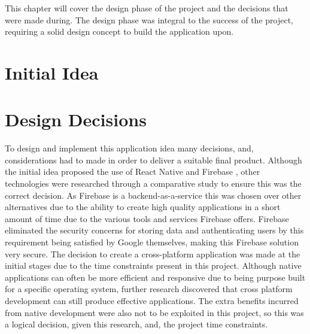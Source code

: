 This chapter will cover the design phase of the project and the decisions  that were made during. The design phase was integral to the success of the project, requiring a solid design concept to build the application upon.

\section{Initial Idea}


\section{Design Decisions}\label{designDecis}
To design and implement this application idea many decisions, and, considerations had to made in order to deliver a suitable final product. Although the initial idea proposed the use of React Native \cite{reactnative} and Firebase \cite{firebase}, other technologies were researched through a comparative study \cite{compStudy} to ensure this was the correct decision. As Firebase is a backend-as-a-service this was chosen over other alternatives due to the ability to create high quality applications in a short amount of time due to the various tools and services Firebase offers. Firebase eliminated the security concerns for storing data and authenticating  users by this requirement being satisfied by Google themselves, making this Firebase solution very secure. The decision to create a cross-platform application was made at the initial stages due to the time constraints present in this project. Although native applications can often be more efficient and responsive due to being purpose built for a specific operating system, further research discovered that cross platform development can still produce effective applications. The extra benefits incurred from native development were also not to be exploited in this project, so this was a logical decision, given this research, and, the project time constraints.


